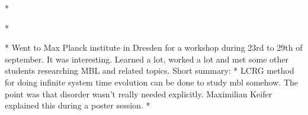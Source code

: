 \documentclass[a4paper]{article}
\begin{document}
\begin{markdown}
		* 
		
	* 

* Went to Max Planck institute in Dresden for a workshop during 23rd to 29th of september. It was interesting. Learned a lot, worked a lot and met some other students researching MBL and related topics. Short summary:
	* LCRG method for doing infinite system time evolution can be done to study mbl somehow. The point was that disorder wasn't really needed explicitly. Maximilian Keifer explained this during a poster session. 
	* 
	
\end{markdown}
 
\end{document}
